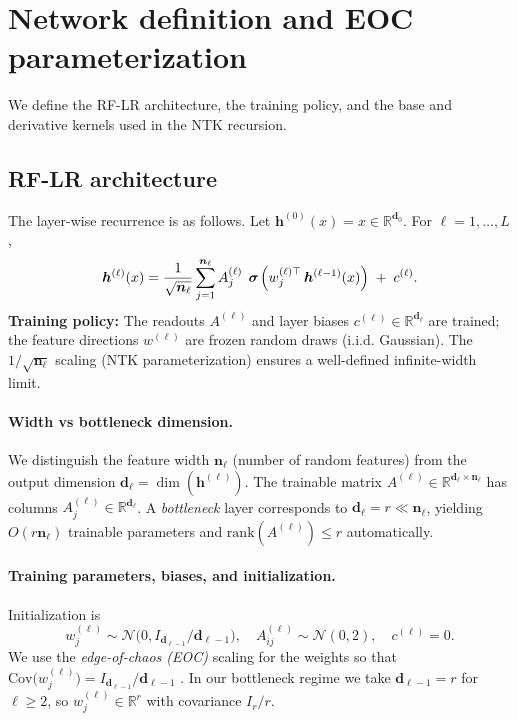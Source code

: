 \section{Network definition and EOC parameterization}\label{sec:network-definition}
We define the RF-LR architecture, the training policy, and the base and derivative kernels used in the NTK recursion.

\subsection{RF-LR architecture}
The layer-wise recurrence is as follows. Let \( \bm{h}^{(0)}(x)=x\in\mathbb{R}^{\bm{d}_0} \). For \( \ell=1,\dots,L \),
\begin{equation}
\label{eq:RF-LR}
\bm{h}^{(\ell)}(x)
= \frac{1}{\sqrt{\bm{n}_\ell}} \sum_{j=1}^{\bm{n}_\ell} A^{(\ell)}_j\,
\bm{\mathrel{\boldsymbol{\sigma}}}\!\Big(w^{(\ell)\top}_j\,\bm{h}^{(\ell-1)}(x)\Big) \;+\; c^{(\ell)}.
\end{equation}
\textbf{Training policy:} The readouts \( A^{(\ell)} \) and layer biases \( c^{(\ell)}\in\mathbb{R}^{\bm{d}_\ell} \) are trained; the feature directions \( w^{(\ell)} \) are frozen random draws (i.i.d. Gaussian). The \( 1/\sqrt{\bm{n}_\ell} \) scaling (NTK parameterization) ensures a well-defined infinite-width limit.
\paragraph{Width vs bottleneck dimension.}
We distinguish the feature width \(\bm{n}_\ell\) (number of random features) from the output dimension \(\bm{d}_\ell=\dim(\bm{h}^{(\ell)})\). The trainable matrix \(A^{(\ell)}\in\mathbb{R}^{\bm{d}_\ell\times \bm{n}_\ell}\) has columns \(A^{(\ell)}_j\in\mathbb{R}^{\bm{d}_\ell}\). A \emph{bottleneck} layer corresponds to \(\bm{d}_\ell=r\ll \bm{n}_\ell\), yielding \(O(r\bm{n}_\ell)\) trainable parameters and \(\mathrm{rank}(A^{(\ell)})\le r\) automatically.

\paragraph{Training parameters, biases, and initialization.}
Initialization is
\[
w^{(\ell)}_j \sim \mathcal{N}\!\big(0, I_{\bm{d}_{\ell-1}}/\bm{d}_{\ell-1}\big),\quad
A^{(\ell)}_{ij} \sim \mathcal{N}\!(0, 2),\quad
c^{(\ell)} = 0.
\]
We use the \emph{edge-of-chaos (EOC)} scaling for the weights so that \( \mathrm{Cov}\!\big(w^{(\ell)}_j\big) = I_{\bm{d}_{\ell-1}}/\bm{d}_{\ell-1} \) \cite{hayou2018selectioninitializationactivationfunction}.
In our bottleneck regime we take \(\bm{d}_{\ell-1}=r\) for \(\ell\ge 2\), so \(w^{(\ell)}_j\in\mathbb{R}^r\) with covariance \(I_r/r\).


